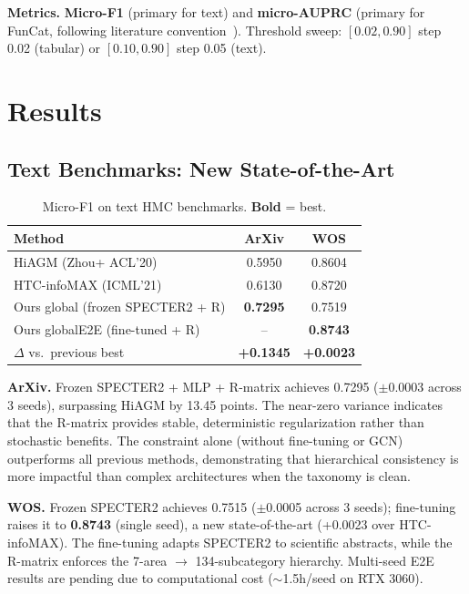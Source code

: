 \documentclass[11pt,a4paper]{article}
\begin{document}
\textbf{Metrics.} \textbf{Micro-F1} (primary for text) and
\textbf{micro-AUPRC} (primary for FunCat, following literature
convention~\cite{www2022ontology}). Threshold sweep: $[0.02, 0.90]$
step 0.02 (tabular) or $[0.10, 0.90]$ step 0.05 (text).

\section{Results}
\label{sec:results}

\subsection{Text Benchmarks: New State-of-the-Art}

\begin{table}[h]
\centering
\caption{Micro-F1 on text HMC benchmarks. \textbf{Bold} = best.}
\label{tab:text}
\begin{tabular}{lcc}
\toprule
\textbf{Method} & \textbf{ArXiv} & \textbf{WOS} \\
\midrule
HiAGM (Zhou+ ACL'20)~\cite{zhou2020hiagm}  & 0.5950 & 0.8604 \\
HTC-infoMAX (ICML'21)~\cite{htcinfomax}    & 0.6130 & 0.8720 \\
\midrule
Ours global (frozen SPECTER2 + R)  & \textbf{0.7295} & 0.7519 \\
Ours globalE2E (fine-tuned + R)    & --            & \textbf{0.8743} \\
\midrule
$\Delta$ vs.\ previous best        & \textbf{+0.1345} & \textbf{+0.0023} \\
\bottomrule
\end{tabular}
\end{table}

\textbf{ArXiv.} Frozen SPECTER2 + MLP + R-matrix achieves 0.7295
($\pm$0.0003 across 3 seeds), surpassing HiAGM by 13.45 points.
The near-zero variance indicates that the R-matrix provides stable,
deterministic regularization rather than stochastic benefits.
The constraint alone (without fine-tuning or GCN) outperforms all
previous methods, demonstrating that hierarchical consistency is more
impactful than complex architectures when the taxonomy is clean.

\textbf{WOS.} Frozen SPECTER2 achieves 0.7515 ($\pm$0.0005 across 3
seeds); fine-tuning raises it to \textbf{0.8743} (single seed), a new
state-of-the-art (+0.0023 over HTC-infoMAX). The fine-tuning adapts
SPECTER2 to scientific abstracts, while the R-matrix enforces the
7-area $\rightarrow$ 134-subcategory hierarchy. Multi-seed E2E results
are pending due to computational cost ($\sim$1.5h/seed on RTX 3060).
\end{document}
